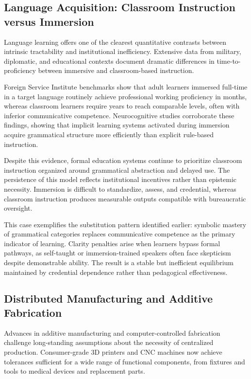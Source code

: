 \documentclass[11pt]{article}
\begin{document}
\subsection{Language Acquisition: Classroom Instruction versus Immersion}

Language learning offers one of the clearest quantitative contrasts between intrinsic tractability and institutional inefficiency. Extensive data from military, diplomatic, and educational contexts document dramatic differences in time-to-proficiency between immersive and classroom-based instruction.

Foreign Service Institute benchmarks show that adult learners immersed full-time in a target language routinely achieve professional working proficiency in months, whereas classroom learners require years to reach comparable levels, often with inferior communicative competence. Neurocognitive studies corroborate these findings, showing that implicit learning systems activated during immersion acquire grammatical structure more efficiently than explicit rule-based instruction.

Despite this evidence, formal education systems continue to prioritize classroom instruction organized around grammatical abstraction and delayed use. The persistence of this model reflects institutional incentives rather than epistemic necessity. Immersion is difficult to standardize, assess, and credential, whereas classroom instruction produces measurable outputs compatible with bureaucratic oversight.

This case exemplifies the substitution pattern identified earlier: symbolic mastery of grammatical categories replaces communicative competence as the primary indicator of learning. Clarity penalties arise when learners bypass formal pathways, as self-taught or immersion-trained speakers often face skepticism despite demonstrable ability. The result is a stable but inefficient equilibrium maintained by credential dependence rather than pedagogical effectiveness.

\subsection{Distributed Manufacturing and Additive Fabrication}

Advances in additive manufacturing and computer-controlled fabrication challenge long-standing assumptions about the necessity of centralized production. Consumer-grade 3D printers and CNC machines now achieve tolerances sufficient for a wide range of functional components, from fixtures and tools to medical devices and replacement parts.
\end{document}
